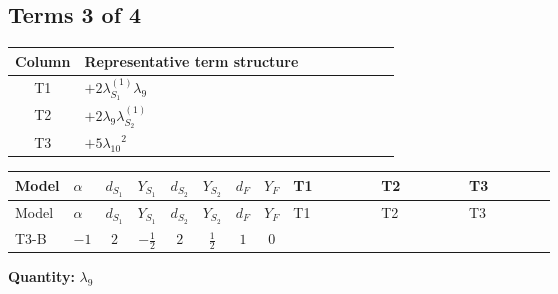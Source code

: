\documentclass[8pt]{article}
\begin{document}
\begin{landscape}
\subsection*{Terms 3 of 4}
\begin{center}
\begin{tabular}{@{}c >{\raggedright\arraybackslash}p{0.82\linewidth}@{}}
\toprule
Column & Representative term structure \\
\midrule
T1 & \(\displaystyle +2 {\lambda_{S_1}^{(1)}} {\lambda_{9}}\) \\
\midrule
T2 & \(\displaystyle +2 {\lambda_{9}} {\lambda_{S_2}^{(1)}}\) \\
\midrule
T3 & \(\displaystyle +5 {\lambda_{10}}^2\) \\
\midrule
\bottomrule
\end{tabular}
\end{center}
\smallskip
\tiny
\begin{longtable}{@{}llcccccc >{\raggedright\arraybackslash}p{0.21\linewidth} >{\raggedright\arraybackslash}p{0.21\linewidth} >{\raggedright\arraybackslash}p{0.21\linewidth}@{}}
\toprule
Model & $\alpha$ & $d_{S_1}$ & $Y_{S_1}$ & $d_{S_2}$ & $Y_{S_2}$ & $d_F$ & $Y_F$ & T1 & T2 & T3 \\
\midrule
\endfirsthead
\toprule
Model & $\alpha$ & $d_{S_1}$ & $Y_{S_1}$ & $d_{S_2}$ & $Y_{S_2}$ & $d_F$ & $Y_F$ & T1 & T2 & T3 \\
\midrule
\endhead
T3-B & $-1$ & $2$ & $-\frac{1}{2}$ & $2$ & $\frac{1}{2}$ & $1$ & $0$ & \scriptsize\adjustbox{max width=\linewidth}{$\begin{gathered} +2 {\lambda_{S_1}^{(1)}} {\lambda_{9}}\end{gathered}$} & \scriptsize\adjustbox{max width=\linewidth}{$\begin{gathered} +2 {\lambda_{9}} {\lambda_{S_2}^{(1)}}\end{gathered}$} & \scriptsize\adjustbox{max width=\linewidth}{$\begin{gathered} +5 {\lambda_{10}}^2 \\ +5 {\lambda_{11}}^2\end{gathered}$} \\
\midrule
\bottomrule
\end{longtable}
\clearpage
\noindent\textbf{Quantity: }$\lambda_{9}$\par\smallskip

\end{landscape}
\end{document}
